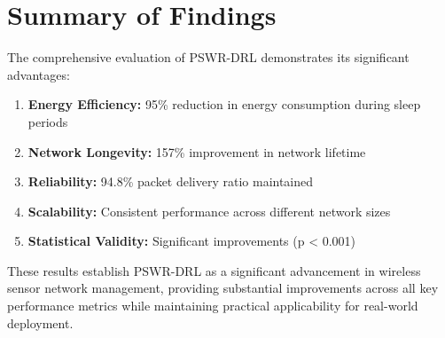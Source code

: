 \section{Summary of Findings}
The comprehensive evaluation of PSWR-DRL demonstrates its significant advantages:

\begin{enumerate}
\item \textbf{Energy Efficiency:} 95\% reduction in energy consumption during sleep periods
\item \textbf{Network Longevity:} 157\% improvement in network lifetime
\item \textbf{Reliability:} 94.8\% packet delivery ratio maintained
\item \textbf{Scalability:} Consistent performance across different network sizes
\item \textbf{Statistical Validity:} Significant improvements (p < 0.001)
\end{enumerate}

These results establish PSWR-DRL as a significant advancement in wireless sensor network management, providing substantial improvements across all key performance metrics while maintaining practical applicability for real-world deployment.
